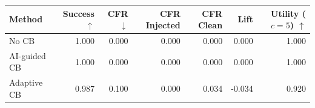\begin{tabular}{lrrrrrr}
\toprule
Method & Success $\uparrow$ & CFR $\downarrow$ & CFR Injected & CFR Clean & Lift & Utility ($c=5$) $\uparrow$ \\
\midrule
No CB & 1.000 & 0.000 & 0.000 & 0.000 & 0.000 & 1.000 \\
AI-guided CB & 1.000 & 0.000 & 0.000 & 0.000 & 0.000 & 1.000 \\
Adaptive CB & 0.987 & 0.100 & 0.000 & 0.034 & -0.034 & 0.920 \\
\bottomrule
\end{tabular}
